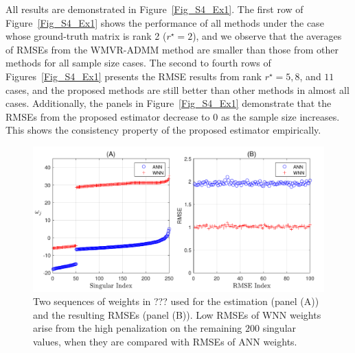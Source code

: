 \documentclass[alpha-refs]{wiley-article}
\begin{document}
All results are demonstrated in Figure~\ref{Fig_S4_Ex1}.
The first row of Figure~\ref{Fig_S4_Ex1} shows the performance of all methods under the case whose ground-truth matrix is rank 2 ($r^{\star} = 2$), and we observe that the averages of RMSEs from the WMVR-ADMM method are smaller than those from other methods for all sample size cases.
The second to fourth rows of Figures~\ref{Fig_S4_Ex1} presents the RMSE results from rank $r^{\star} = 5, 8$, and $11$ cases, and the proposed methods are still better than other methods in almost all cases.
Additionally, the panels in Figure~\ref{Fig_S4_Ex1} demonstrate that the RMSEs from the proposed estimator decrease to $0$ as the sample size increases.
This shows the consistency property of the proposed estimator empirically.

\begin{figure}[b!]
  \includegraphics[width=120mm]{Figure/Fig5.pdf}
  \centering
\caption{Two sequences of weights in ??? used for the estimation (panel (A)) and the resulting RMSEs (panel (B)). Low RMSEs of WNN weights arise from the high penalization on the remaining $200$ singular values, when they are compared with RMSEs of ANN weights.}
  \label{Fig5}
\end{figure}
\end{document}
